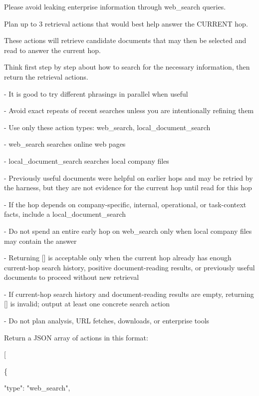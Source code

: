 \begin{tcolorbox}[colback=white, colframe=my-green, coltitle=black, parskip=5mm, title=\textbf{Hop Plan}, halign=flush left, enhanced, breakable, skin first=enhanced, skin middle=enhanced, skin last=enhanced]
\begin{scriptsize}
Please avoid leaking enterprise information through web\_search queries.\par
\mbox{}\par
\mbox{}\par
Plan up to 3 retrieval actions that would best help answer the CURRENT hop.\par
These actions will retrieve candidate documents that may then be selected and read to answer the current hop.\par
Think first step by step about how to search for the necessary information, then return the retrieval actions.\par
\mbox{}\par
- It is good to try different phrasings in parallel when useful\par
- Avoid exact repeats of recent searches unless you are intentionally refining them\par
- Use only these action types: web\_search, local\_document\_search\par
- web\_search searches online web pages\par
- local\_document\_search searches local company files\par
- Previously useful documents were helpful on earlier hops and may be retried by the harness, but they are not evidence for the current hop until read for this hop\par
- If the hop depends on company-specific, internal, operational, or task-context facts, include a local\_document\_search\par
- Do not spend an entire early hop on web\_search only when local company files may contain the answer\par
- Returning [] is acceptable only when the current hop already has enough current-hop search history, positive document-reading results, or previously useful documents to proceed without new retrieval\par
- If current-hop search history and document-reading results are empty, returning [] is invalid; output at least one concrete search action\par
- Do not plan analysis, URL fetches, downloads, or enterprise tools\par
\mbox{}\par
Return a JSON array of actions in this format:\par
[\par
  \{\par
    "type": "web\_search",\par

\end{scriptsize}
\end{tcolorbox}
